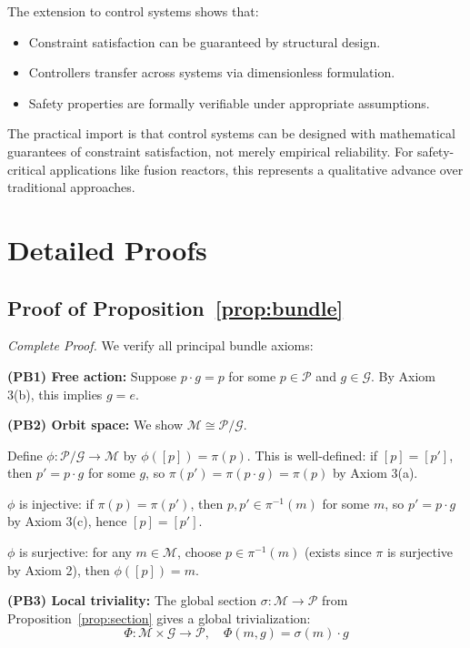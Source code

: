 \documentclass[11pt]{article}
\begin{document}
The extension to control systems shows that:
\begin{itemize}
    \item Constraint satisfaction can be guaranteed by structural design.
    \item Controllers transfer across systems via dimensionless formulation.
    \item Safety properties are formally verifiable under appropriate assumptions.
\end{itemize}

The practical import is that control systems can be designed with mathematical guarantees
of constraint satisfaction, not merely empirical reliability. For safety-critical applications like
fusion reactors, this represents a qualitative advance over traditional approaches.

\appendix

\section{Detailed Proofs}

\subsection{Proof of Proposition~\ref{prop:bundle}}

\textit{Complete Proof.} We verify all principal bundle axioms:

\textbf{(PB1) Free action:} Suppose $p \cdot g = p$ for some $p \in \mathcal{P}$ and $g \in \mathcal{G}$. By Axiom 3(b), this
implies $g = e$.

\textbf{(PB2) Orbit space:} We show $\mathcal{M} \cong \mathcal{P}/\mathcal{G}$.

Define $\phi : \mathcal{P}/\mathcal{G} \to \mathcal{M}$ by $\phi([p]) = \pi(p)$. This is well-defined: if $[p] = [p']$, then $p' = p \cdot g$ for
some $g$, so $\pi(p') = \pi(p \cdot g) = \pi(p)$ by Axiom 3(a).

$\phi$ is injective: if $\pi(p) = \pi(p')$, then $p, p' \in \pi^{-1}(m)$ for some $m$, so $p' = p \cdot g$ by Axiom 3(c),
hence $[p] = [p']$.

$\phi$ is surjective: for any $m \in \mathcal{M}$, choose $p \in \pi^{-1}(m)$ (exists since $\pi$ is surjective by Axiom
2), then $\phi([p]) = m$.

\textbf{(PB3) Local triviality:} The global section $\sigma : \mathcal{M} \to \mathcal{P}$ from Proposition~\ref{prop:section} gives a global
trivialization:
\[
\Phi : \mathcal{M} \times \mathcal{G} \to \mathcal{P}, \quad \Phi(m, g) = \sigma(m) \cdot g
\]
\end{document}
